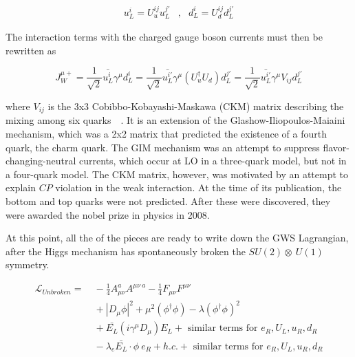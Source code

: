 \begin{equation}\label{eq:ewk_quark_transformaitons}
\begin{aligned}
u_{L}^{i} = U_{u}^{ij}u_{L}^{j\prime} &,                 & d_{L}^{i} = U_{d}^{ij}d_{L}^{j\prime}
\end{aligned}
\end{equation}

\noindent The interaction terms with the charged gauge boson currents
must then be rewritten as

\begin{equation}\label{eq:ewk_ckm_intro}
J_{W}^{\mu+} = \frac{1}{\sqrt{2}}\bar{u_{L}^{i}}\gamma^{\mu}d_{L}^{i}
=
\frac{1}{\sqrt{2}}\bar{u_{L}^{i\prime}}\gamma^{\mu}(U_{u}^{\dagger}U_{d})d_{L}^{j\prime}
= \frac{1}{\sqrt{2}}\bar{u_{L}^{i\prime}}\gamma^{\mu}V_{ij}d_{L}^{j\prime}
\end{equation}

\noindent where $V_{ij}$ is the 3x3 Cobibbo-Kobayashi-Maskawa (CKM) matrix
describing the mixing among six
quarks~\cite{th:CKM_matrix_C}~\cite{th:CKM_matrix_KM}.  It is an
extension of the Glashow-Iliopoulos-Maiaini mechanism, which was a 2x2
matrix that predicted the existence of a fourth quark, the charm quark.  The GIM
mechanism was an attempt to suppress flavor-changing-neutral currents,
which occur at LO in a three-quark model, but not in a four-quark
model.  The CKM matrix, however, was motivated by an attempt to
explain $CP$ violation in the weak interaction.  At the time of its
publication, the bottom and top quarks were not predicted.  After
these were discovered, they were awarded the nobel prize in physics in
2008.  

\par At this point, all the of the pieces are ready to write down the
GWS Lagrangian, after the Higgs mechanism has spontaneously broken the
$SU(2)\otimes~U(1)$ symmetry.

\begin{equation}\label{eq:ewk_lagrangian_unbroken}
\begin{aligned}
\mathcal{L}_{Unbroken} = &~ -\frac{1}{4}A_{\mu\nu}^{a}A^{\mu\nu~a} -
\frac{1}{4}F_{\mu\nu}F^{\mu\nu} \\
&~ + |D_{\mu}\phi|^{2} + \mu^{2}(\phi^{\dagger}\phi) - \lambda(\phi^{\dagger}\phi)^{2} \\
&~ + \bar{E_{L}}(i\gamma^{\mu}D_{\mu})E_{L} + \text{ similar terms for }
    e_{R}, U_{L}, u_{R}, d_{R} \\
&~ -\lambda_{e}\bar{E_{L}}\cdot\phi~e_{R} + h.c. + \text{ similar
  terms for } e_{R}, U_{L}, u_{R}, d_{R}
\end{aligned}
\end{equation}

